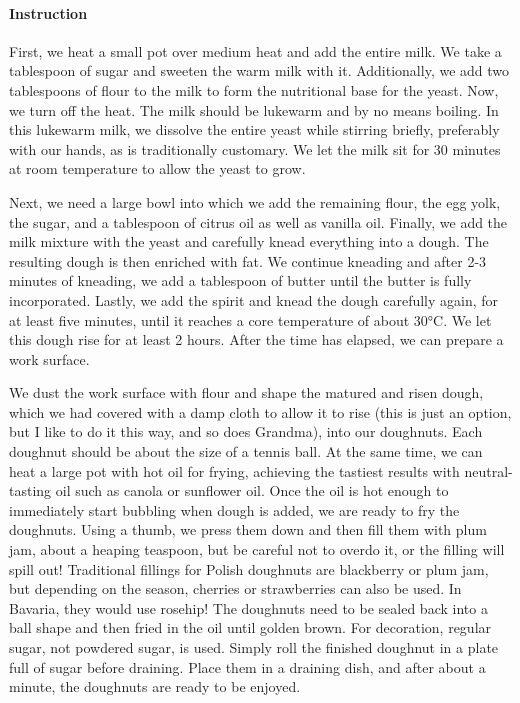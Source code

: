 \paragraph{Instruction}
First, we heat a small pot over medium heat and add the entire milk. We take a tablespoon of sugar and sweeten the warm milk with it. Additionally, we add two tablespoons of flour to the milk to form the nutritional base for the yeast. Now, we turn off the heat. The milk should be lukewarm and by no means boiling. In this lukewarm milk, we dissolve the entire yeast while stirring briefly, preferably with our hands, as is traditionally customary. We let the milk sit for 30 minutes at room temperature to allow the yeast to grow.

Next, we need a large bowl into which we add the remaining flour, the egg yolk, the sugar, and a tablespoon of citrus oil as well as vanilla oil. Finally, we add the milk mixture with the yeast and carefully knead everything into a dough. The resulting dough is then enriched with fat. We continue kneading and after 2-3 minutes of kneading, we add a tablespoon of butter until the butter is fully incorporated. Lastly, we add the spirit and knead the dough carefully again, for at least five minutes, until it reaches a core temperature of about 30°C. We let this dough rise for at least 2 hours. After the time has elapsed, we can prepare a work surface.

We dust the work surface with flour and shape the matured and risen dough, which we had covered with a damp cloth to allow it to rise (this is just an option, but I like to do it this way, and so does Grandma), into our doughnuts. Each doughnut should be about the size of a tennis ball. At the same time, we can heat a large pot with hot oil for frying, achieving the tastiest results with neutral-tasting oil such as canola or sunflower oil. Once the oil is hot enough to immediately start bubbling when dough is added, we are ready to fry the doughnuts. Using a thumb, we press them down and then fill them with plum jam, about a heaping teaspoon, but be careful not to overdo it, or the filling will spill out! Traditional fillings for Polish doughnuts are blackberry or plum jam, but depending on the season, cherries or strawberries can also be used. In Bavaria, they would use rosehip! The doughnuts need to be sealed back into a ball shape and then fried in the oil until golden brown. For decoration, regular sugar, not powdered sugar, is used. Simply roll the finished doughnut in a plate full of sugar before draining. Place them in a draining dish, and after about a minute, the doughnuts are ready to be enjoyed.